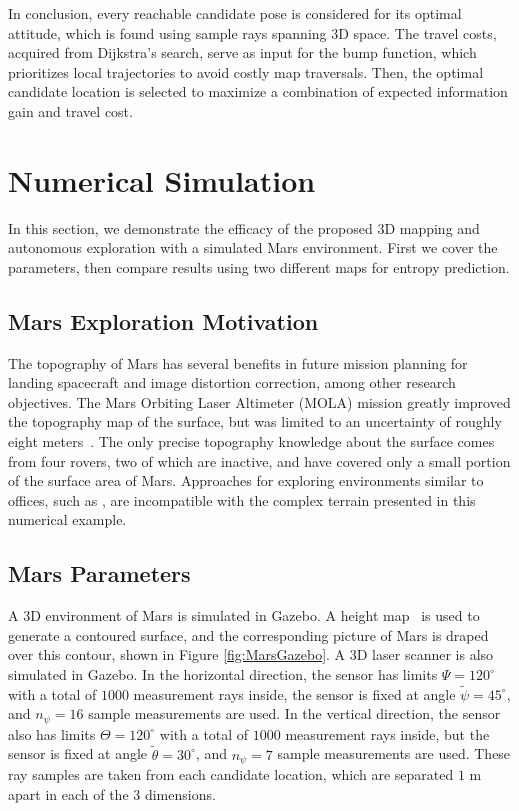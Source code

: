In conclusion, every reachable candidate pose is considered for its optimal attitude, which is found using sample rays spanning 3D space. The travel costs, acquired from Dijkstra's search, serve as input for the bump function, which prioritizes local trajectories to avoid costly map traversals. Then, the optimal candidate location is selected to maximize a combination of expected information gain and travel cost.



\section{Numerical Simulation}
\label{sec:MarsSimulation}

In this section, we demonstrate the efficacy of the proposed 3D mapping and autonomous exploration with a simulated Mars environment. First we cover the parameters, then compare results using two different maps for entropy prediction.

\subsection{Mars Exploration Motivation}

The topography of Mars has several benefits in future mission planning for landing spacecraft and  image distortion correction, among other research objectives. The Mars Orbiting Laser Altimeter (MOLA) mission greatly improved the topography map of the surface, but was limited to an uncertainty of roughly eight meters~\cite{MOLA99}. The only precise topography knowledge about the surface comes from four rovers, two of which are inactive, and have covered only a small portion of the surface area of Mars. Approaches for exploring environments similar to offices, such as \cite{MauDakPet14}, are incompatible with the complex terrain presented in this numerical example.

\subsection{Mars Parameters}

A 3D environment of Mars is simulated in Gazebo. A height map~\cite{mapaplanet} is used to generate a contoured surface, and the corresponding picture of Mars is draped over this contour, shown in Figure \ref{fig:MarsGazebo}. A 3D laser scanner is also simulated in Gazebo. In the horizontal direction, the sensor has limits $\Psi=120^{\circ}$ with a total of $1000$ measurement rays inside, the sensor is fixed at angle $\tilde{\psi}=45^{\circ}$, and $n_\psi=16$ sample measurements are used. In the vertical direction, the sensor also has limits $\Theta=120^{\circ}$ with a total of $1000$ measurement rays inside, but the sensor is fixed at angle $\tilde{\theta}=30^{\circ}$, and $n_\psi=7$ sample measurements are used. These ray samples are taken from each candidate location, which are separated $1$ m apart in each of the $3$ dimensions.


